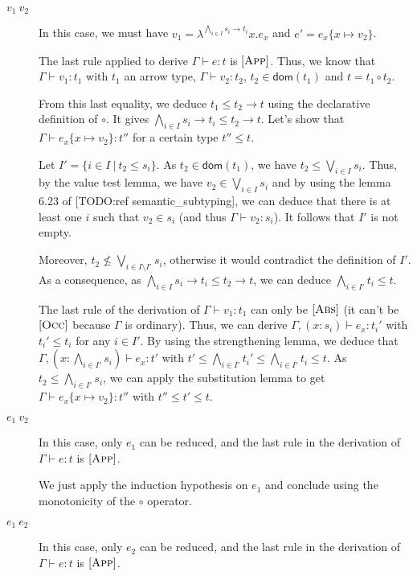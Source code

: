 \documentclass[a4paper]{article}%
\newcommand{\apply}[2]{#1\circ#2}
\newcommand{\dom}[1]{\textsf{dom}(#1)}
\newcommand{\alt}{~|~}
\newcommand{\subst}[2]{\{#1 \mapsto #2\}}
\theoremstyle{definition}
\newcommand {\Rule}[1] {[\textsc{#1}]}
\begin{document}
        \begin{description}
          \item[$v_1\ v_2$] In this case, we must have $v_1=\lambda^{\bigwedge_{i\in I} s_i \rightarrow t_i}x.e_x$ and $e'=e_x\subst x {v_2}$.
    
          The last rule applied to derive $\Gamma \vdash e:t$ is $\Rule{App}$.
          Thus, we know that $\Gamma \vdash v_1 : t_1$ with $t_1$ an arrow type, $\Gamma \vdash v_2 : t_2$, $t_2 \in \dom {t_1}$ and $t=\apply {t_1} {t_2}$.
    
          From this last equality, we deduce $t_1 \leq t_2 \rightarrow t$ using the declarative definition of $\circ$.
          It gives $\bigwedge_{i\in I} s_i \rightarrow t_i \leq t_2 \rightarrow t$.
          Let's show that $\Gamma \vdash e_x\subst x {v_2}:t''$ for a certain type $t''\leq t$.
    
          Let $I'=\{i\in I\alt t_2 \leq s_i\}$. As $t_2 \in \dom {t_1}$, we have $t_2 \leq \bigvee_{i\in I} s_i$.
          Thus, by the value test lemma, we have $v_2 \in \bigvee_{i\in I} s_i$ and by using the lemma 6.23 of [TODO:ref semantic_subtyping],
          we can deduce that there is at least one $i$ such that $v_2 \in s_i$ (and thus $\Gamma \vdash v_2 : s_i$).
          It follows that $I'$ is not empty.
    
          Moreover, $t_2 \not\leq \bigvee_{i\in I\setminus I'} s_i$, otherwise it would contradict the definition of $I'$.
          As a consequence, as $\bigwedge_{i\in I} s_i \rightarrow t_i \leq t_2 \rightarrow t$,
          we can deduce $\bigwedge_{i \in I'}t_i \leq t$.
    
          The last rule of the derivation of $\Gamma \vdash v_1 : t_1$ can only be $\Rule{Abs}$ (it can't be $\Rule{Occ}$ because $\Gamma$ is ordinary).
          Thus, we can derive $\Gamma,(x:s_i) \vdash e_x : t_i'$ with $t_i' \leq t_i$ for any $i\in I'$. By using the strengthening lemma, we deduce that
          $\Gamma, (x:\bigwedge_{i\in I'} s_i) \vdash e_x:t'$ with $t'\leq \bigwedge_{i\in I'} t_i' \leq \bigwedge_{i\in I'} t_i \leq t$.
          As $t_2 \leq \bigwedge_{i\in I'} s_i$, we can apply the substitution lemma to get $\Gamma \vdash e_x\subst x {v_2}:t''$ with $t'' \leq t' \leq t$.
    
          \item[$e_1\ v_2$] In this case, only $e_1$ can be reduced, and the last rule in the derivation of $\Gamma \vdash e:t$ is $\Rule{App}$.
    
          We just apply the induction hypothesis on $e_1$ and conclude using the monotonicity of the $\circ$ operator.
          \item[$e_1\ e_2$] In this case, only $e_2$ can be reduced, and the last rule in the derivation of $\Gamma \vdash e:t$ is $\Rule{App}$.
    

\end{description}
\end{document}
